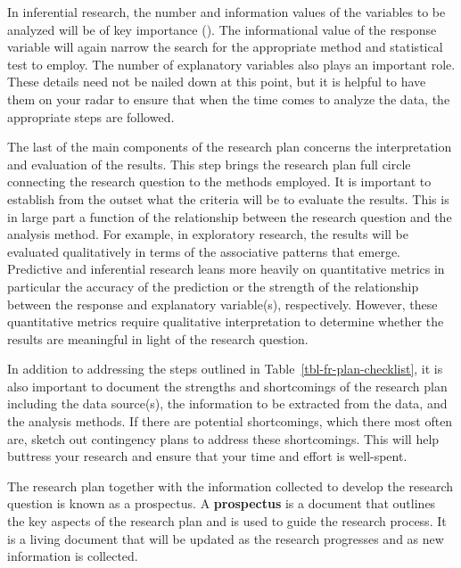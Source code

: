 \documentclass[
  letterpaper,
]{latex/krantz}
\theoremstyle{definition}
\theoremstyle{remark}
\begin{document}
In inferential research, the number and information values of the
variables to be analyzed will be of key importance
(). The informational value
of the response variable will again narrow the search for the
appropriate method and statistical test to employ. The number of
explanatory variables also plays an important role. These details need
not be nailed down at this point, but it is helpful to have them on your
radar to ensure that when the time comes to analyze the data, the
appropriate steps are followed.

The last of the main components of the research plan concerns the
interpretation and evaluation of the results. This step brings the
research plan full circle connecting the research question to the
methods employed. It is important to establish from the outset what the
criteria will be to evaluate the results. This is in large part a
function of the relationship between the research question and the
analysis method. For example, in exploratory research, the results will
be evaluated qualitatively in terms of the associative patterns that
emerge. Predictive and inferential research leans more heavily on
quantitative metrics in particular the accuracy of the prediction or the
strength of the relationship between the response and explanatory
variable(s), respectively. However, these quantitative metrics require
qualitative interpretation to determine whether the results are
meaningful in light of the research question.

In addition to addressing the steps outlined in
Table~\ref{tbl-fr-plan-checklist}, it is also important to document the
strengths and shortcomings of the research plan including the data
source(s), the information to be extracted from the data, and the
analysis methods. If there are potential shortcomings, which there most
often are, sketch out contingency plans to address these shortcomings.
This will help buttress your research and ensure that your time and
effort is well-spent.

The research plan together with the information collected to develop the
research question is known as a prospectus. A \textbf{prospectus} is a
document that outlines the key aspects of the research plan and is used
to guide the research process. It is a living document that will be
updated as the research progresses and as new information is collected.
\end{document}
